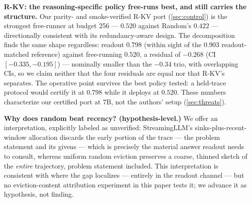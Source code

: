 \documentclass{article}
\begin{document}
\textbf{R-KV: the reasoning-specific policy free-runs best, and still carries the structure.} Our parity- and smoke-verified R-KV port (\cref{sec:control}) is the strongest free-runner at budget 256 --- $0.520$ against Random's $0.422$ --- directionally consistent with its redundancy-aware design. The decomposition finds the same shape regardless: readout $0.798$ (within sight of the $0.903$ readout-matched reference) against free-running $0.520$, a residual of $-0.268$ (CI $[-0.335, -0.195]$) --- nominally smaller than the $-0.34$ trio, with overlapping CIs, so we claim neither that the four residuals are equal nor that R-KV's separates. The operative point survives the best policy tested: a held-trace protocol would certify it at $0.798$ while it deploys at $0.520$. These numbers characterize our certified port at 7B, not the authors' setup (\cref{sec:threats}).

\textbf{Why does random beat recency? (hypothesis-level.)} We offer an interpretation, explicitly labeled as unverified: StreamingLLM's sinks-plus-recent-window allocation discards the early portion of the trace --- the problem statement and its givens --- which is precisely the material answer readout needs to consult, whereas uniform random eviction preserves a coarse, thinned sketch of the \emph{entire} trajectory, problem statement included. This interpretation is consistent with where the gap localizes --- entirely in the readout channel --- but no eviction-content attribution experiment in this paper tests it; we advance it as hypothesis, not finding.
\end{document}
